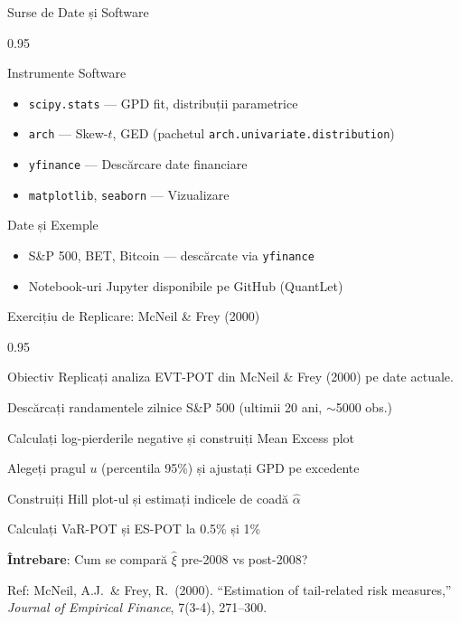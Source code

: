 \documentclass[9pt, aspectratio=169, t]{beamer}
\begin{document}
\begin{frame}{Surse de Date și Software}
    \begin{cminipage}{0.95\textwidth}
    \begin{block}{Instrumente Software}
        {\small
        \begin{itemize}\setlength{\itemsep}{0pt}
            \item \texttt{scipy.stats} --- GPD fit, distribuții parametrice
            \item \texttt{arch} --- Skew-$t$, GED (pachetul \texttt{arch.univariate.distribution})
            \item \texttt{yfinance} --- Descărcare date financiare
            \item \texttt{matplotlib}, \texttt{seaborn} --- Vizualizare
        \end{itemize}
        }
    \end{block}
    \begin{block}{Date și Exemple}
        {\small
        \begin{itemize}\setlength{\itemsep}{0pt}
            \item S\&P 500, BET, Bitcoin --- descărcate via \texttt{yfinance}
            \item Notebook-uri Jupyter disponibile pe GitHub (QuantLet)
        \end{itemize}
        }
    \end{block}
    \end{cminipage}
\end{frame}

\begin{frame}{Exercițiu de Replicare: McNeil \& Frey (2000)}
    \begin{cminipage}{0.95\textwidth}
        \begin{block}{Obiectiv}
            Replicați analiza EVT-POT din McNeil \& Frey (2000) pe date actuale.
        \end{block}
        \begin{enumerate}\setlength{\itemsep}{2pt}
            {\small
            \item Descărcați randamentele zilnice S\&P 500 (ultimii 20 ani, $\sim$5000 obs.)
            \item Calculați log-pierderile negative și construiți Mean Excess plot
            \item Alegeți pragul $u$ (percentila 95\%) și ajustați GPD pe excedente
            \item Construiți Hill plot-ul și estimați indicele de coadă $\hat{\alpha}$
            \item Calculați VaR-POT și ES-POT la 0.5\% și 1\%
            \item \textbf{Întrebare}: Cum se compară $\hat{\xi}$ pre-2008 vs post-2008?
            }
        \end{enumerate}
        {\tiny Ref: McNeil, A.J.\ \& Frey, R.\ (2000). ``Estimation of tail-related risk measures,'' \textit{Journal of Empirical Finance}, 7(3-4), 271--300.}
    \end{cminipage}
\end{frame}
\end{document}
